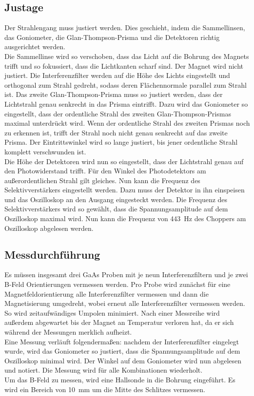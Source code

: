 \subsection{Justage}
\noindent Der Strahlengang muss justiert werden. Dies geschieht, indem die Sammellinsen, das Goniometer, die Glan-Thompson-Prisma und 
die Detektoren richtig ausgerichtet werden. \\
Die Sammellinse wird so verschoben, dass das Licht auf die Bohrung des Magnets trifft und so fokussiert, dass die Lichtkanten scharf sind. 
Der Magnet wird nicht justiert.
Die Interferenzfilter werden auf die Höhe des Lichts eingestellt und orthogonal zum Strahl gedreht, sodass deren Flächennormale parallel zum 
Strahl ist. Das zweite Glan-Thompson-Prisma muss so justiert werden, dass der Lichtstrahl genau senkrecht in das Prisma eintrifft. Dazu wird 
das Goniometer so eingestellt, dass der ordentliche Strahl des zweiten Glan-Thompson-Prismas maximal unterdrückt wird. Wenn der ordentliche 
Strahl des zweiten Prismas noch zu erkennen ist, trifft der Strahl noch nicht genau senkrecht auf das zweite Prisma. Der Eintrittswinkel wird 
so lange justiert, bis jener ordentliche Strahl komplett verschwunden ist. \\
Die Höhe der Detektoren wird nun so eingestellt, dass der Lichtstrahl genau auf den Photowiderstand trifft. Für den Winkel des Photodetektors 
am außerordentlichen Strahl gilt gleiches.
Nun kann die Frequenz des Selektivverstärkers eingestellt werden. Dazu muss der Detektor in ihn einspeisen und das Oszilloskop an den Ausgang 
eingesteckt werden. Die Frequenz des Selektivverstärkers wird so gewählt, dass die Spannungsamplitude auf dem Oszilloskop maximal wird.
Nun kann die Frequenz von \qty{443}{\hertz} des Choppers am Oszilloskop abgelesen werden.


\subsection{Messdurchführung}
\noindent Es müssen insgesamt drei GaAs Proben mit je neun Interferenzfiltern und je zwei B-Feld Orientierungen vermessen werden.
Pro Probe wird zunächst für eine Magnetfeldorientierung alle Interferenzfilter vermessen und dann die Magnetisierung umgedreht, wobei erneut alle 
Interferenzfilter vermessen werden. So wird zeitaufwändiges Umpolen minimiert. Nach einer Messreihe wird außerdem abgewartet bis der Magnet an 
Temperatur verloren hat, da er sich während der Messungen merklich aufheizt.\\
Eine Messung verläuft folgendermaßen: nachdem der Interferenzfilter eingelegt wurde, wird das Goniometer so justiert, dass die Spannungsamplitude 
auf dem Oszilloskop minimal wird. Der Winkel auf dem Goniometer wird nun abgelesen und notiert. Die Messung wird für alle Kombinationen wiederholt.\\
Um das B-Feld zu messen, wird eine Hallsonde in die Bohrung eingeführt. Es wird ein Bereich von \qty{10}{\milli \meter} um die Mitte des Schlitzes 
vermessen. 



